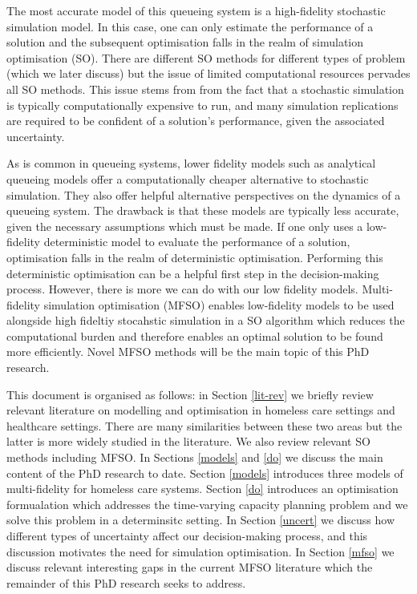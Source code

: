 \documentclass[12pt,a4paper]{article}
\begin{document}
The most accurate model of this queueing system is a high-fidelity stochastic simulation model. In this case, one can only estimate the performance of a solution and the subsequent optimisation falls in the realm of simulation optimisation (SO). There are different SO methods for different types of problem (which we later discuss) but the issue of limited computational resources pervades all SO methods. This issue stems from from the fact that a stochastic simulation is typically computationally expensive to run, and many simulation replications are required to be confident of a solution's performance, given the associated uncertainty.

As is common in queueing systems, lower fidelity models such as analytical queueing models offer a computationally cheaper alternative to stochastic simulation. They also offer helpful alternative perspectives on the dynamics of a queueing system. The drawback is that these models are typically less accurate, given the necessary assumptions which must be made. If one only uses a low-fidelity deterministic model to evaluate the performance of a solution, optimisation falls in the realm of deterministic optimisation. Performing this deterministic optimisation can be a helpful first step in the decision-making process. However, there is more we can do with our low fidelity models. Multi-fidelity simulation optimisation (MFSO) enables low-fidelity models to be used alongside high fideltiy stocahstic simulation in a SO algorithm which reduces the computational burden and therefore enables an optimal solution to be found more efficiently. Novel MFSO methods will be the main topic of this PhD research.

This document is organised as follows: in Section \ref{lit-rev} we briefly review relevant literature on modelling and optimisation in homeless care settings and healthcare settings. There are many similarities between these two areas but the latter is more widely studied in the literature. We also review relevant SO methods including MFSO. In Sections \ref{models} and \ref{do} we discuss the main content of the PhD research to date. Section \ref{models} introduces three models of multi-fidelity for homeless care systems. Section \ref{do} introduces an optimisation formualation which addresses the time-varying capacity planning problem and we solve this problem in a determinsitc setting. In Section \ref{uncert} we discuss how different types of uncertainty affect our decision-making process, and this discussion motivates the need for simulation optimisation. In Section \ref{mfso} we discuss relevant interesting gaps in the current MFSO literature which the remainder of this PhD research seeks to address.
\end{document}
